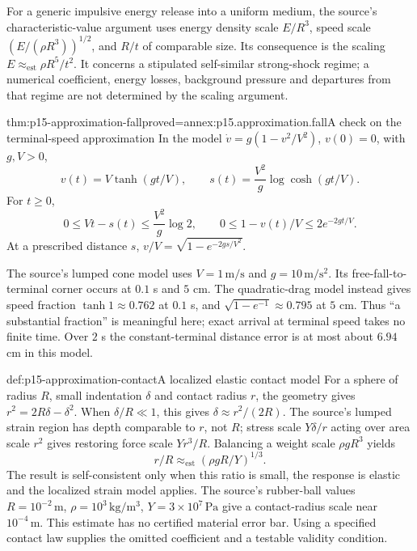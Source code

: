 For a generic impulsive energy release into a uniform medium, the source's
characteristic-value argument uses energy density scale \(E/R^3\), speed
scale \((E/(\rho R^3))^{1/2}\), and \(R/t\) of comparable size. Its
consequence is the scaling \(E\approx_{\mathrm{est}}\rho R^5/t^2\).
It concerns a stipulated self-similar strong-shock regime; a numerical
coefficient, energy losses, background pressure and departures from that
regime are not determined by the scaling argument.

\begin{hbtheorem}{thm:p15-approximation-fall}{proved=annex:p15.approximation.fall}{A check on the terminal-speed approximation}
In the model \(\dot v=g(1-v^2/V^2)\), \(v(0)=0\), with \(g,V>0\),
\[
 v(t)=V\tanh(gt/V),\qquad
 s(t)=\frac{V^2}{g}\log\cosh(gt/V).
\]
For \(t\geq0\),
\[
 0\leq Vt-s(t)\leq\frac{V^2}{g}\log2,\qquad
 0\leq1-v(t)/V\leq2e^{-2gt/V}.
\]
At a prescribed distance \(s\),
\(v/V=\sqrt{1-e^{-2gs/V^2}}\).
\end{hbtheorem}

The source's lumped cone model uses \(V=1\,\mathrm{m/s}\) and
\(g=10\,\mathrm{m/s^2}\). Its free-fall-to-terminal corner occurs at
\(0.1\) s and \(5\) cm. The quadratic-drag model instead gives speed
fraction \(\tanh1\approx0.762\) at \(0.1\) s, and
\(\sqrt{1-e^{-1}}\approx0.795\) at \(5\) cm. Thus ``a substantial fraction''
is meaningful here; exact arrival at terminal speed takes no finite time.
Over \(2\) s the constant-terminal distance error is at most about
\(6.94\) cm in this model.

\begin{hbexample}{def:p15-approximation-contact}{A localized elastic contact model}
For a sphere of radius \(R\), small indentation \(\delta\) and contact
radius \(r\), the geometry gives \(r^2=2R\delta-\delta^2\).
When \(\delta/R\ll1\), this gives \(\delta\approx r^2/(2R)\).
The source's lumped strain region has depth comparable to \(r\), not \(R\);
stress scale \(Y\delta/r\) acting over area scale \(r^2\) gives restoring
force scale \(Yr^3/R\). Balancing a weight scale \(\rho gR^3\) yields
\[
 r/R\approx_{\mathrm{est}}(\rho gR/Y)^{1/3}.
\]
The result is self-consistent only when this ratio is small, the response
is elastic and the localized strain model applies. The source's rubber-ball
values \(R=10^{-2}\,\mathrm m\), \(\rho=10^3\,\mathrm{kg/m^3}\),
\(Y=3\times10^7\,\mathrm{Pa}\) give a contact-radius scale near
\(10^{-4}\,\mathrm m\). This estimate has no certified material error bar.
Using a specified contact law supplies the omitted coefficient and a
testable validity condition.
\end{hbexample}

